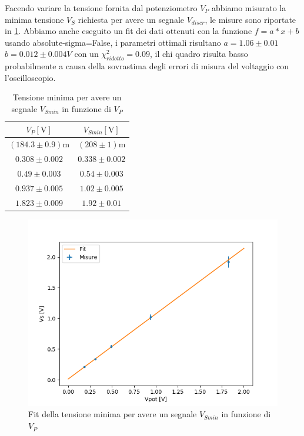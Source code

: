 \documentclass{article}
\begin{document}
		Facendo variare la tensione fornita dal potenziometro $V_P$ abbiamo misurato la minima tensione $V_S$ richiesta per avere un segnale $V_{discr}$, le misure sono riportate in \ref{tab 1c2}. Abbiamo anche eseguito un fit dei dati ottenuti con la funzione $f=a*x+b$ usando absolute-sigma=False, i parametri ottimali risultano $a=1.06\pm0.01$ $b=0.012\pm0.004 V$ con un $\chi^2_{ridotto}=0.09$, il chi quadro risulta basso probabilmente a causa della sovrastima degli errori di misura del voltaggio con l'oscilloscopio.
		\begin{table}
			\begin{center}
				\begin{tabular}{cc}
					\hline
					$V_P [\mathrm{V}]$&$V_{Smin} [\mathrm{V}]$ \\
					\hline
					$(184.3\pm0.9) \mathrm{m}$ & $(208\pm1)\mathrm{m}$ \\
					$0.308\pm0.002$ & $0.338\pm0.002$ \\
					$0.49\pm0.003$ & $0.54\pm0.003$ \\
					$0.937\pm0.005$ & $1.02\pm0.005$ \\
					$1.823\pm0.009$ & $1.92\pm0.01$ \\
					\hline
				\end{tabular}
			\end{center}
			\caption{Tensione minima per avere un segnale $V_{Smin}$ in funzione di $V_{P}$}
			\label{tab 1c2}
		\end{table}
		
		\begin{figure}
			\centering
			\includegraphics[width=\linewidth]{immagini/1c-2.png}
			\caption{Fit della tensione minima per avere un segnale $V_{Smin}$ in funzione di $V_{P}$}
			\label{fit:1c-2}
		\end{figure}
		\newpage
\end{document}
